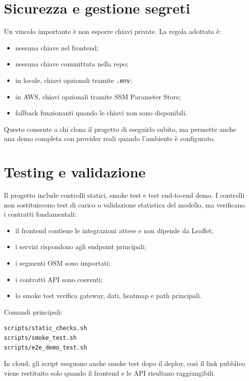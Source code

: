 \documentclass[11pt,a4paper]{article}
\begin{document}
\section{Sicurezza e gestione segreti}

Un vincolo importante \`e non esporre chiavi private. La regola adottata \`e:

\begin{itemize}
  \item nessuna chiave nel frontend;
  \item nessuna chiave committata nella repo;
  \item in locale, chiavi opzionali tramite \texttt{.env};
  \item in AWS, chiavi opzionali tramite SSM Parameter Store;
  \item fallback funzionanti quando le chiavi non sono disponibili.
\end{itemize}

Questo consente a chi clona il progetto di eseguirlo subito, ma permette anche una demo completa con provider reali quando l'ambiente \`e configurato.

\section{Testing e validazione}

Il progetto include controlli statici, smoke test e test end-to-end demo. I controlli non sostituiscono test di carico o validazione statistica del modello, ma verificano i contratti fondamentali:

\begin{itemize}
  \item il frontend contiene le integrazioni attese e non dipende da Leaflet;
  \item i servizi rispondono agli endpoint principali;
  \item i segmenti OSM sono importati;
  \item i contratti API sono coerenti;
  \item lo smoke test verifica gateway, dati, heatmap e path principali.
\end{itemize}

Comandi principali:

\begin{lstlisting}[language=bash]
scripts/static_checks.sh
scripts/smoke_test.sh
scripts/e2e_demo_test.sh
\end{lstlisting}

In cloud, gli script eseguono anche smoke test dopo il deploy, cos\`i il link pubblico viene restituito solo quando il frontend e le API risultano raggiungibili.
\end{document}
